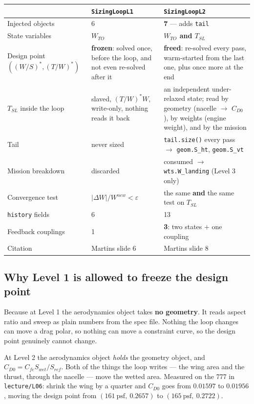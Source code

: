 \documentclass[11pt, a4paper]{article}
\begin{document}
\begin{center}
\footnotesize
\begin{tabular}{@{}p{42mm}p{48mm}p{62mm}@{}}
\toprule
& \textbf{\texttt{SizingLoopL1}} & \textbf{\texttt{SizingLoopL2}} \\
\midrule
Injected objects & 6 & \textbf{7} --- adds \texttt{tail} \\
State variables & $W_{TO}$ & \textbf{$W_{TO}$ and $T_{SL}$} \\
Design point $\left((W/S)^*,(T/W)^*\right)$
  & \textbf{frozen}: solved once, before the loop, and not even re-solved after it
  & \textbf{freed}: re-solved every pass, warm-started from the last one, plus once more at the end \\
$T_{SL}$ inside the loop
  & slaved, $(T/W)^* W$, write-only, nothing reads it back
  & an independent under-relaxed state; read by geometry (nacelle $\rightarrow$ $C_{D0}$), by weights (engine weight), and by the mission \\
Tail & never sized & \texttt{tail.size()} every pass $\rightarrow$ \texttt{geom.S\_ht}, \texttt{geom.S\_vt} \\
Mission breakdown & discarded & consumed $\rightarrow$ \texttt{wts.W\_landing} (Level 3 only) \\
Convergence test & $|\Delta W|/W^{new} < \varepsilon$ & the same \textbf{and} the same test on $T_{SL}$ \\
\texttt{history} fields & 6 & 13 \\
Feedback couplings & 1 & \textbf{3}: two states $+$ one coupling \\
Citation & Martins slide 6 & Martins slide 8 \\
\bottomrule
\end{tabular}
\end{center}

\subsection{Why Level 1 is allowed to freeze the design point}

Because at Level 1 the aerodynamics object takes \textbf{no geometry}. It reads
aspect ratio and sweep as plain numbers from the spec file. Nothing the loop
changes can move a drag polar, so nothing can move a constraint curve, so the
design point genuinely cannot change.

At Level 2 the aerodynamics object \emph{holds} the geometry object, and
$C_{D0} = C_{fe} S_{wet} / S_{ref}$. Both of the things the loop writes ---
the wing area and the thrust, through the nacelle --- move the wetted area.
Measured on the 777 in \texttt{lecture/L06}: shrink the wing by a quarter and
$C_{D0}$ goes from $0.01597$ to $0.01956$, moving the design point from
$(161\ \mathrm{psf},\ 0.2657)$ to $(165\ \mathrm{psf},\ 0.2722)$.
\end{document}
